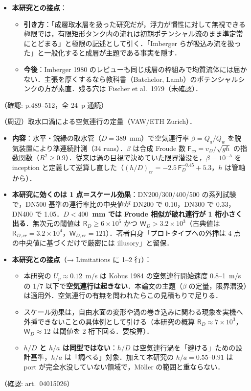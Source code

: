 \documentclass[11pt]{jsarticle}
\newcommand{\litref}[1]{{\large\bfseries\color{citecolor}#1}}
\begin{document}
\begin{itemize}
  \item \textbf{本研究との接点}：
  \begin{itemize}
    \item \textbf{引き方}：「成層取水層を扱った研究だが，浮力が慣性に対して無視できる極限では，有限矩形タンク内の流れは初期ポテンシャル流のまま準定常にとどまる」と極限の記述として引く．「Imberger らが吸込み流を扱った」と一般化すると成層が主題である事実を隠す．
    \item \textbf{今後}：Imberger 1980 のレビューも同じ成層の枠組みで均質流体には届かない．主張を厚くするなら教科書（Batchelor, Lamb）のポテンシャルシンクの方が素直．残る穴は Fischer et al.\ 1979（未確認）．
  \end{itemize}
\end{itemize}
\noindent（確認: p.489--512，全 24~p 通読）

\noindent\litref{M\"oller et al. (2015)}\quad（周辺）取水口渦による空気連行の定量（VAW/ETH Zurich）．
\begin{itemize}
  \item \textbf{内容}：水平・鋭縁の取水管（$D = 389$~mm）で空気連行率 $\beta = Q_a/Q_w$ を脱気装置により準連続計測（34 runs）．$\beta$ は合成 Froude 数 $\mathsf{F}_{co} = v_D/\sqrt{gh}$ の指数関数（$R^2 \geq 0.9$）．従来は渦の目視で決めていた限界潜没を，$\beta = 10^{-5}$ を inception と定義して逆算し直した（$(h/D)_{cr} = -2.5\,\mathsf{F}_D^{-0.45} + 5.3$，$h$ は管軸から）．
  \item \textbf{本研究に効くのは 1 点＝スケール効果}：DN200/300/400/500 の系列試験で，DN500 基準の連行率比の中央値が DN200 で 0.10，DN300 で 0.33，DN400 で 1.05．\textbf{$D < 400$~mm では Froude 相似が破れ連行が 1 桁小さく出る}．無次元の閾値は $\mathsf{R}_D \geq 6\times10^5$ かつ $\mathsf{W}_D > 3.2\times10^3$（古典値は $\mathsf{R}_{D,cr} = 3.2\times10^4$，$\mathsf{W}_{D,cr} = 121$）．著者自身「プロトタイプへの外挿は 4 点の中央値に基づくだけで厳密には illusory」と留保．
  \item \textbf{本研究との接点}（→ Limitations に 1--2 行）：
  \begin{itemize}
    \item 本研究の $U_p \approx 0.12$~m/s は Kobus 1984 の空気連行開始速度 0.8--1~m/s の 1/7 以下で\textbf{空気連行は起きない}．本論文の主題（$\beta$ の定量，限界潜没）は適用外．空気連行の有無を問われたらこの見積もりで足りる．
    \item スケール効果は，自由水面の変形や渦の巻き込みに関わる現象を実機へ外挿できないことの具体例として引ける（本研究の概算 $\mathsf{R}_D \approx 7\times10^3$，$\mathsf{W}_D \approx 12$ は閾値を 2 桁下回る．要検算）．
    \item \textbf{$h/D$ と $h/a$ は同型ではない}：$h/D$ は空気連行渦を「避ける」ための設計基準，$h/a$ は「調べる」対象．加えて本研究の $h/a = 0.55$--$0.91$ は port が完全水没していない領域で，M\"oller の範囲と重ならない．
  \end{itemize}
\end{itemize}
\noindent（確認: art.\ 04015026）
\end{document}
